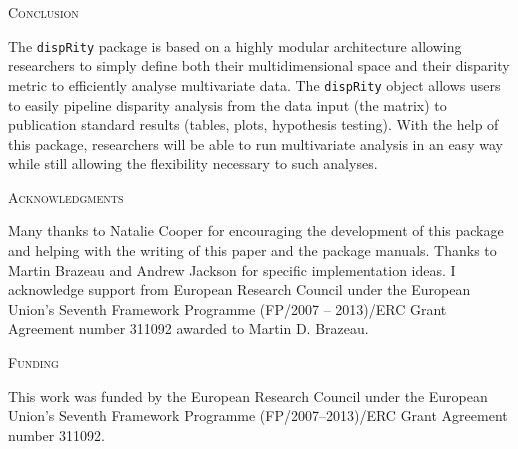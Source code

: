 \documentclass[12pt,letterpaper]{article}
\renewcommand{\section}[1]{%
\bigskip
\begin{center}
\begin{Large}
\normalfont\scshape #1
\medskip
\end{Large}
\end{center}}
\newcommand{\disp}{\texttt{dispRity} }
\begin{document}
\section{Conclusion}
The \disp package is based on a highly modular architecture allowing researchers to simply define both their multidimensional space and their disparity metric to efficiently analyse multivariate data.
The \disp object allows users to easily pipeline disparity analysis from the data input (the matrix) to publication standard results (tables, plots, hypothesis testing).
With the help of this package, researchers will be able to run multivariate analysis in an easy way while still allowing the flexibility necessary to such analyses.


\section{Acknowledgments}
Many thanks to Natalie Cooper for encouraging the development of this package and helping with the writing of this paper and the package manuals.
Thanks to Martin Brazeau and Andrew Jackson for specific implementation ideas. %
I acknowledge support from European Research Council under the European Union's Seventh Framework Programme (FP/2007 – 2013)/ERC Grant Agreement number 311092 awarded to Martin D. Brazeau.

\section{Funding}
This work was funded by the European Research Council under the European Union's Seventh Framework Programme (FP/2007–2013)/ERC Grant Agreement number 311092.



\end{document}
